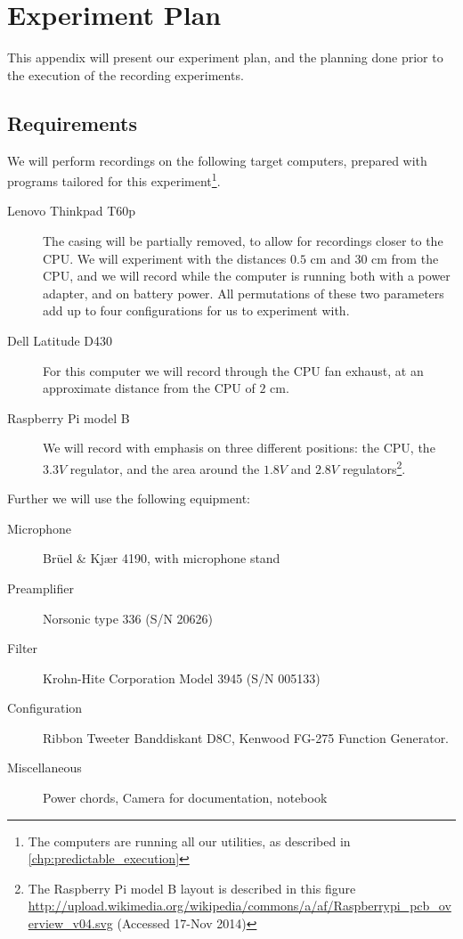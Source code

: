 \chapter{Experiment Plan}\label{apx:experiment_plan}
This appendix will present our experiment plan, and the planning done prior to the execution of the recording experiments.

\section{Requirements}

We will perform recordings on the following target computers, prepared with programs tailored for this experiment\footnote{The computers are running all our utilities, as described in \autoref{chp:predictable_execution}}.
\begin{description}
	\item[Lenovo Thinkpad T60p] The casing will be partially removed, to allow for recordings closer to the CPU. We will experiment with the distances $0.5$ cm and $30$ cm from the CPU, and we will record while the computer is running both with a power adapter, and on battery power. All permutations of these two parameters add up to four configurations for us to experiment with.
	\item[Dell Latitude D430] For this computer we will record through the CPU fan exhaust, at an approximate distance from the CPU of $2$ cm.
	\item[Raspberry Pi model B] We will record with emphasis on three different positions: the CPU, the $3.3V$ regulator, and the area around the $1.8V$ and $2.8V$ regulators\footnote{The Raspberry Pi model B layout is described in this figure \url{http://upload.wikimedia.org/wikipedia/commons/a/af/Raspberrypi_pcb_overview_v04.svg} (Accessed 17-Nov 2014)}.
\end{description}

Further we will use the following equipment:
\begin{description}
	\item[Microphone] Brüel \& Kjær 4190, with microphone stand
	\item[Preamplifier] Norsonic type 336 (S/N 20626)
	\item[Filter] Krohn-Hite Corporation Model 3945 (S/N 005133)
	\item[Configuration] Ribbon Tweeter Banddiskant D8C, Kenwood FG-275 Function Generator.
	\item[Miscellaneous] Power chords, Camera for documentation, notebook
\end{description}

